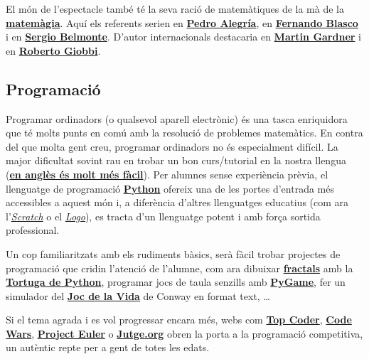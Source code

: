 \documentclass[a4paper, 12pt]{article}
\begin{document}
            El món de l'espectacle també té la seva ració de matemàtiques de la mà de la \href{https://ca.wikipedia.org/wiki/Matem\%C3\%A0gia}{\textbf{matemàgia}}. Aquí els referents serien en \href{http://www.ehu.eus/~mtpalezp/}{\textbf{Pedro Alegría}}, en \href{http://fblasco.net/}{\textbf{Fernando Blasco}} i en \href{https://magiaymatematicas.blogspot.com/}{\textbf{Sergio Belmonte}}. D'autor internacionals destacaria en \href{https://ca.wikipedia.org/wiki/Martin_Gardner}{\textbf{Martin Gardner}} i en \href{https://en.wikipedia.org/wiki/Roberto_Giobbi}{\textbf{Roberto Giobbi}}.

        \subsection*{Programació}

            Programar ordinadors (o qualsevol aparell electrònic) és una tasca enriquidora que té molts punts en comú amb la resolució de problemes matemàtics. En contra del que molta gent creu, programar ordinadors no és especialment difícil. La major dificultat sovint rau en trobar un bon curs/tutorial en la nostra llengua (\href{https://www.sololearn.com/Course/Python/}{\textbf{en anglès és molt més fàcil}}). Per alumnes sense experiència prèvia, el llenguatge de programació \href{https://ca.wikipedia.org/wiki/Python}{\textbf{Python}} ofereix una de les portes d'entrada més accessibles a aquest món i, a diferència d'altres llenguatges educatius (com ara l'\href{https://ca.wikipedia.org/wiki/Scratch_(llenguatge_de_programaci\%C3\%B3)}{\emph{Scratch}} o el \href{https://ca.wikipedia.org/wiki/Llenguatge_de_programaci\%C3\%B3_Logo}{\emph{Logo}}), es tracta d'un llenguatge potent i amb força sortida professional.

            Un cop familiaritzats amb els rudiments bàsics, serà fàcil trobar projectes de programació que cridin l'atenció de l'alumne, com ara dibuixar \href{https://ca.wikipedia.org/wiki/Fractal}{\textbf{fractals}} amb la \href{https://opentechschool.github.io/python-beginners/es_CL/simple_drawing.html}{\textbf{Tortuga de Python}}, programar jocs de taula senzills amb \href{https://www.pygame.org/}{\textbf{PyGame}}, fer un simulador del \href{https://ca.wikipedia.org/wiki/Joc_de_la_vida}{\textbf{Joc de la Vida}} de Conway en format text, \dots

            Si el tema agrada i es vol progressar encara més, webs com \href{https://www.topcoder.com/community/arena}{\textbf{Top Coder}}, \href{https://www.codewars.com/}{\textbf{Code Wars}}, \href{https://projecteuler.net/}{\textbf{Project Euler}} o \href{https://jutge.org/}{\textbf{Jutge.org}} obren la porta a la programació competitiva, un autèntic repte per a gent de totes les edats.
\end{document}

